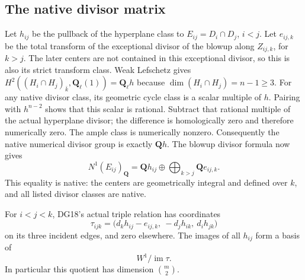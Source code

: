 \subsection{The native divisor matrix}

Let $h_{ij}$ be the pullback of the hyperplane class to
$E_{ij}=D_i\cap D_j$, $i<j$.  Let $e_{ij,k}$ be the total
transform of the exceptional divisor of the blowup along
$Z_{ij,k}$, for $k>j$.  The later centers are not contained
in this exceptional divisor, so this is also its strict
transform class.  Weak Lefschetz gives
$H^2((H_i\cap H_j)_{\bar k},\mathbf Q_\ell(1))
=\mathbf Q_\ell h$ because $\dim(H_i\cap H_j)=n-1\ge3$.
For any native divisor class, its geometric cycle class is a scalar
multiple of $h$.  Pairing with $h^{n-2}$ shows that this scalar
is rational.  Subtract that rational multiple of the actual
hyperplane divisor; the difference is homologically zero and
therefore numerically zero.  The ample class is numerically
nonzero.  Consequently the native numerical divisor group
is exactly $\mathbf Qh$.  The blowup divisor formula now gives
\[
 N^1(E_{ij})_{\mathbf Q}
   =\mathbf Q h_{ij}\oplus
                 \bigoplus_{k>j}\mathbf Q e_{ij,k}.
 \tag{NF18.4}\label{r18nf:picard}
\]
This equality is native: the centers are geometrically integral
and defined over $k$, and all listed divisor classes are native.

\begin{lemma}
\label{r18nf:triple}
For $i<j<k$, DG18's actual triple relation has coordinates
\[
 \tau_{ijk}=
 \bigl(d_k h_{ij}-e_{ij,k},\ -d_j h_{ik},\ d_i h_{jk}\bigr)
 \tag{NF18.5}\label{r18nf:triple-formula}
\]
on its three incident edges, and zero elsewhere.  The images
of all $h_{ij}$ form a basis of
\[
              W^1/\operatorname{im}\tau.
 \tag{NF18.6}\label{r18nf:quotient-basis}
\]
In particular this quotient has dimension $\binom m2$.
\end{lemma}

